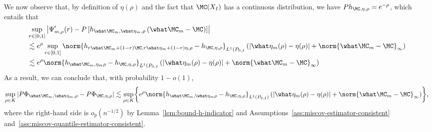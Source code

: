 We now observe that, by definition of $\eta(\rho)$ and the fact that $\MC(X_I)$ has a continuous distribution, we have $P h_{\MC,  \eta, \rho} = e^{-\rho}$,  which entails that
\begin{align*}
&\sup_{r \in [0,1]} \left| \Psi_{m, \rho}'(r) - P \left[ h_{\what \MC_m,  \what \eta_m, \rho}\left( \what \MC_m - \MC \right) \right] \right| \\
&\lesssim e^\rho \sup_{r \in [0,1]} \norm{h_{r \what \MC_m + (1-r) \MC,  r \what \eta_m + (1-r) \eta, \rho} - h_{\MC,  \eta, \rho}}_{L^1(P_{0,I}} \left( \left| \what \eta_m(\rho)  - \eta(\rho) \right| + \norm{\what \MC_m - \MC}_{\infty} \right) \\
&\lesssim e^\rho \norm{h_{ \what \MC_m,  \eta_m \rho} - h_{\MC,  \eta, \rho}}_{L^1(P_{0,I}} \left( \left| \what \eta_m(\rho)  - \eta(\rho) \right| + \norm{\what \MC_m - \MC}_{\infty} \right)
\end{align*}
As a result, we can conclude that, with probability $1-o(1)$, 
\begin{align*}
\sup_{\rho \in K} \left|P \Phi_{\what \MC_m, \what \eta_m, \rho} - P\Phi_{\MC,  \eta, \rho} \right| \lesssim \sup_{\rho \in K} \biggr\{ e^\rho \norm{h_{ \what \MC_m, \what \eta_m \rho} - h_{\MC,  \eta, \rho}}_{L^1(P_{0,I})} \left( \left| \what \eta_m(\rho)  - \eta(\rho) \right| + \norm{\what \MC_m - \MC}_{\infty} \right) \biggr\},
\end{align*}
where the right-hand side is $o_p(n^{-1/2})$ by Lemma~\ref{lem:bound-h-indicator} and Assumptions~\ref{ass:miscov-estimator-consistent} and~\ref{ass:miscov-quantile-estimator-consistent}.



